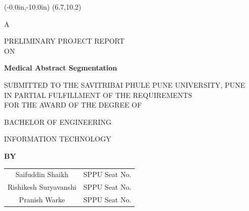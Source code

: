 \documentclass[12pt,a4paper]{report}     %
\begin{document}
\newpage
\pagestyle{plain}
\pagestyle{empty}
\pagestyle{fancy}							%
\renewcommand{\headrulewidth}{0pt}


	\thisfancyput(-0.0in,-10.0in){%
\setlength{\unitlength}{1in}\framebox(6.7,10.2)}
\begin{center}
      
      \begin{center} {A} \end{center}
      \vspace{0.2 in}
      { PRELIMINARY PROJECT REPORT}
      \vspace{0.2 in}\\
       ON
			\end{center}
	\begin{center}
	    \vspace{0.1 in}
		\textbf{\large  Medical Abstract Segmentation } %
		\vspace{0.2 in}
	\end{center}
     \vspace{0.2 in}
		\begin{center}
	    SUBMITTED TO THE SAVITRIBAI PHULE PUNE UNIVERSITY, PUNE \\
	    IN PARTIAL FULFILLMENT OF THE REQUIREMENTS\\
	    FOR THE AWARD OF THE DEGREE OF
	\end{center}
	\vspace{0.1 in}
	
	\begin{center}
	   {BACHELOR OF ENGINEERING}\\
	    \begin{small}{ INFORMATION TECHNOLOGY}
\end{small}	\end{center}
	\vspace{0.1 in}
	
	\begin{center}
	   \textbf{BY}
	\end{center}
	\vspace{0.1 in}
	
	\begin{center}
\begin{tabular}{ c c }
    
    Saifuddin Shaikh & SPPU Seat No. \\
    Rishikesh Suryavanshi & SPPU Seat No. \\
    Pranish Warke & SPPU Seat No. \\
\end{tabular}
 
	\end{center}
	\vspace{0.1 in}
	
\end{document}
